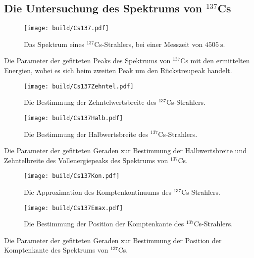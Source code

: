 \subsection{Die Untersuchung des Spektrums von $^{137}$Cs}
\begin{figure}
	\centering
	\texttt{[image: build/Cs137.pdf]}
	\caption{Das Spektrum eines $^{137}$Cs-Strahlers, bei einer Messzeit von $\SI{4505}{\second}$.}
	\label{fig:2}
\end{figure}
\begin{table}
	\centering
	\caption{Die Parameter der gefitteten Peaks des Spektrums von $^{137}$Cs mit den ermittelten Energien, wobei es sich beim zweiten Peak um den Rückstreupeak handelt.}
	
\end{table}
\begin{figure}
	\centering
	\texttt{[image: build/Cs137Zehntel.pdf]}
	\caption{Die Bestimmung der Zehntelwertsbreite des $^{137}$Cs-Strahlers.}
	\label{fig:10tel}
\end{figure}
\begin{figure}
	\centering
	\texttt{[image: build/Cs137Halb.pdf]}
	\caption{Die Bestimmung der Halbwertsbreite des $^{137}$Cs-Strahlers.}
	\label{fig:2tel}
\end{figure}
\begin{table}
	\centering
	\caption{Die Parameter der gefitteten Geraden zur Bestimmung der Halbwertsbreite und Zehntelbreite des Vollenergiepeaks des Spektrums von $^{137}$Cs.}
	
\end{table}
\begin{figure}
	\centering
	\texttt{[image: build/Cs137Kon.pdf]}
	\caption{Die Approximation des Komptenkontinuums des $^{137}$Cs-Strahlers.}
	\label{fig:Komptenkontinuums}
\end{figure}
\begin{figure}
	\centering
	\texttt{[image: build/Cs137Emax.pdf]}
	\caption{Die Bestimmung der Position der Komptenkante des $^{137}$Cs-Strahlers.}
	\label{fig:Emax}
\end{figure}
\begin{table}
	\centering
	\caption{Die Parameter der gefitteten Geraden zur Bestimmung der Position der Komptenkante des Spektrums von $^{137}$Cs.}
	
\end{table}
